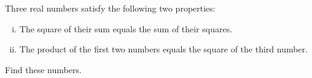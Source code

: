 \documentclass[varwidth]{standalone}
\begin{document}
    Three real numbers satisfy the following two properties:
    \begin{enumerate}[(i)]
        \item The square of their sum equals the sum of their squares.
        \item The product of the first two numbers equals the square of the third number.
    \end{enumerate}
    Find these numbers.
\end{document}
